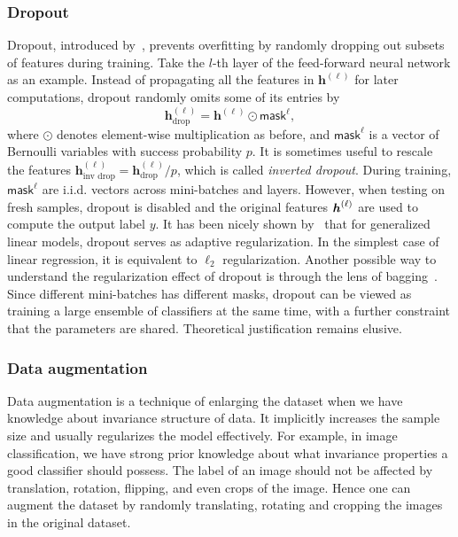 \subsubsection{Dropout} \label{sec:dropout}

Dropout, introduced by~\cite{hinton2012improving}, prevents overfitting by randomly dropping out subsets of features
during training. Take the $l$-th layer of the feed-forward neural
network as an example. Instead of propagating all the features in $\bm{h}^{(\ell)}$ for later
computations, dropout randomly omits some of its entries by
\[
\bm{h}_{\text{drop}}^{(\ell)}=\bm{h}^{(\ell)}\odot\mathsf{mask}^{\ell},
\]
where $\odot$ denotes element-wise multiplication as before, and $\mathsf{mask}^{\ell}$ is a vector of Bernoulli variables with success probability $p$. It is sometimes useful to rescale the features $\bm{h}_{\text{inv drop}}^{(\ell)}=\bm{h}_{\text{drop}}^{(\ell)}/p$, which is called \textit{inverted dropout}. During training, $\mathsf{mask}^{\ell}$ are i.i.d. vectors across mini-batches and layers. However, when testing on fresh samples, dropout is disabled
and the original features $\text{\boldmath $h$}^{(\ell)}$ are used to compute the
output label $y$. It has been nicely shown by~\cite{wager2013dropout}
that for generalized linear models, dropout serves as adaptive
regularization. In the simplest case of linear regression, it is equivalent
to $\ell_{2}$ regularization. Another possible way to understand
the regularization effect of dropout is through the lens of bagging~\citep{deeplearningbook}.
Since different mini-batches has different masks, dropout can be viewed
as training a large ensemble of classifiers at the same time, with
a further constraint that the parameters are shared. %
Theoretical justification remains elusive.
%


\subsubsection{Data augmentation}\label{sec:aug}
Data augmentation is a technique of enlarging the dataset when we have knowledge about invariance structure of data. It implicitly increases the sample size and usually regularizes the model effectively. For example, in image classification, we have strong prior knowledge about what invariance properties a good classifier should possess. The label of an image should not be affected by translation, rotation, flipping, and even crops of the image. Hence one can augment the dataset by randomly translating, rotating and cropping the images in the original dataset.

